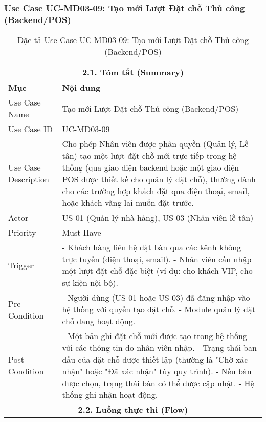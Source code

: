 \subsubsection{Use Case UC-MD03-09: Tạo mới Lượt Đặt chỗ Thủ công (Backend/POS)}
\begin{longtable}{|m{4cm}|p{11cm}|}
\caption{Đặc tả Use Case UC-MD03-09: Tạo mới Lượt Đặt chỗ Thủ công (Backend/POS)} \label{tab:uc_md03_09_revised_v3} \\
\hline
\multicolumn{2}{|c|}{\textbf{2.1. Tóm tắt (Summary)}} \\
\hline
\textbf{Mục} & \textbf{Nội dung} \\
\hline
\endhead %
\hline
\endfoot %
\hline
\endlastfoot %
Use Case Name & Tạo mới Lượt Đặt chỗ Thủ công (Backend/POS) \\
\hline
Use Case ID & UC-MD03-09 \\
\hline
Use Case Description & Cho phép Nhân viên được phân quyền (Quản lý, Lễ tân) tạo một lượt đặt chỗ mới trực tiếp trong hệ thống (qua giao diện backend hoặc một giao diện POS được thiết kế cho quản lý đặt chỗ), thường dành cho các trường hợp khách đặt qua điện thoại, email, hoặc khách vãng lai muốn đặt trước. \\
\hline
Actor & US-01 (Quản lý nhà hàng), US-03 (Nhân viên lễ tân) \\
\hline
Priority & Must Have \\
\hline
Trigger & - Khách hàng liên hệ đặt bàn qua các kênh không trực tuyến (điện thoại, email). \newline - Nhân viên cần nhập một lượt đặt chỗ đặc biệt (ví dụ: cho khách VIP, cho sự kiện nội bộ). \\
\hline
Pre-Condition & - Người dùng (US-01 hoặc US-03) đã đăng nhập vào hệ thống với quyền tạo đặt chỗ. \newline - Module quản lý đặt chỗ đang hoạt động. \\
\hline
Post-Condition & - Một bản ghi đặt chỗ mới được tạo trong hệ thống với các thông tin do nhân viên nhập. \newline - Trạng thái ban đầu của đặt chỗ được thiết lập (thường là "Chờ xác nhận" hoặc "Đã xác nhận" tùy quy trình). \newline - Nếu bàn được chọn, trạng thái bàn có thể được cập nhật. \newline - Hệ thống ghi nhận hoạt động. \\
\hline
\multicolumn{2}{|c|}{\textbf{2.2. Luồng thực thi (Flow)}} \\

\end{longtable}
